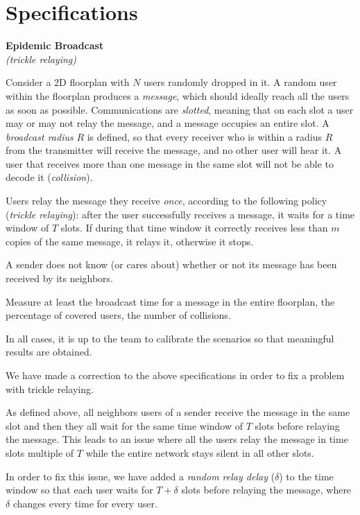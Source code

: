 \chapter{Specifications}\label{ch:specs}

\begin{center}
	\Large \textbf{Epidemic Broadcast}\\
	\normalsize \textit{(trickle relaying)}
\end{center}

\noindent Consider a 2D floorplan with \(N\) users randomly dropped in it. A
random user within the floorplan produces a \emph{message}, which should ideally
reach all the users as soon as possible. Communications are \emph{slotted},
meaning that on each slot a user may or may not relay the message, and a message
occupies an entire slot. A \emph{broadcast radius} \(R\) is defined, so that
every receiver who is within a radius \(R\) from the transmitter will receive
the message, and no other user will hear it. A user that receives more than one
message in the same slot will not be able to decode it (\emph{collision}).

Users relay the message they receive \emph{once}, according to the following
policy (\emph{trickle relaying}): after the user successfully receives a
message, it waits for a time window of \(T\) slots. If during that time window
it correctly receives less than \(m\) copies of the same message, it relays it,
otherwise it stops.

A sender does not know (or cares about) whether or not its message has been
received by its neighbors.

Measure at least the broadcast time for a message in the entire floorplan, the
percentage of covered users, the number of collisions.

In all cases, it is up to the team to calibrate the scenarios so that meaningful
results are obtained.

\begin{tcolorbox}[title=Note]
	We have made a correction to the above specifications in order to fix a
	problem with trickle relaying.

	As defined above, all neighbors users of a sender receive the message in
	the same slot and then they all wait for the same time window of \(T\)
	slots before relaying the message. This leads to an issue where all the
	users relay the message in time slots multiple of \(T\) while the entire
	network stays silent in all other slots.

	In order to fix this issue, we have added a \emph{random relay delay}
	(\(\delta\)) to the time window so that each user waits for \(T+\delta\)
	slots before relaying the message, where \(\delta\) changes every time
	for every user.
\end{tcolorbox}
